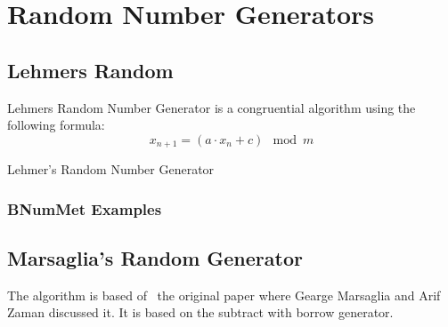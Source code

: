 \section*{Random Number Generators}
\subsection*{Lehmers Random}
Lehmers Random Number Generator is a congruential algorithm using the following formula:
\begin{equation*}
    x_{n+1} = (a\cdot x_n +c) \mod{m}
\end{equation*}


\begin{algorithm}[H]

\label{alg:lehmersrand}

\SetAlgoLined
{}
\caption{Lehmer's Random Number Generator}

\end{algorithm}
\subsubsection*{BNumMet Examples}


\subsection*{Marsaglia's Random Generator}
The algorithm is based of~\cite{10.1214/aoap/1177005878} the original paper where Gearge Marsaglia and Arif Zaman discussed it. It is based on the subtract with borrow generator. 

